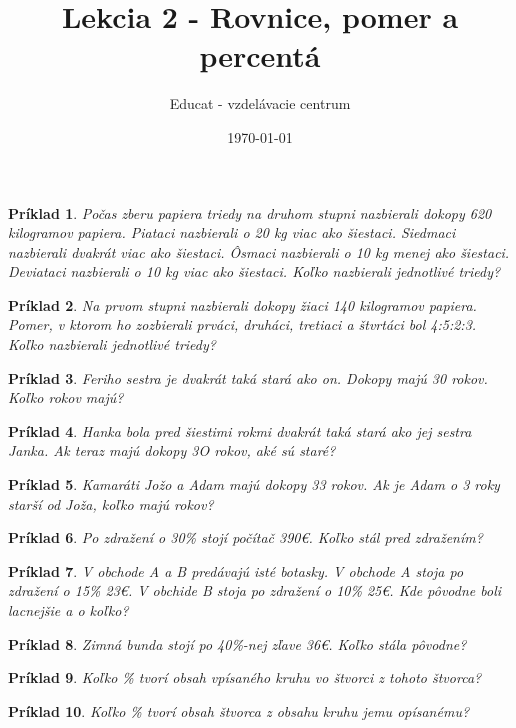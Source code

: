\documentclass{article}
\title{Lekcia 2 - Rovnice, pomer a percentá}
\date{\today}
\author{Educat - vzdelávacie centrum}
\newtheorem{example}{Príklad}
\begin{document}
	\maketitle
	
	\begin{example}
		Počas zberu papiera triedy na druhom stupni nazbierali dokopy 620 kilogramov papiera. Piataci nazbierali o 20 kg viac ako šiestaci. Siedmaci nazbierali dvakrát viac ako šiestaci. Ôsmaci nazbierali o 10 kg menej ako šiestaci. Deviataci nazbierali o 10 kg viac ako šiestaci.
		Koľko nazbierali jednotlivé triedy?
	\end{example}
	
	\begin{example}
		Na prvom stupni nazbierali dokopy žiaci 140 kilogramov papiera. Pomer, v ktorom ho zozbierali prváci, druháci, tretiaci a štvrtáci bol 4:5:2:3. Koľko nazbierali jednotlivé triedy?
	\end{example}
	
	\begin{example}
		Feriho sestra je dvakrát taká stará ako on. Dokopy majú 30 rokov. Koľko rokov majú?
	\end{example}
	
	\begin{example}
		Hanka bola pred šiestimi rokmi dvakrát taká stará ako jej sestra Janka. Ak teraz majú dokopy 3O rokov, aké sú staré?
	\end{example}
	
	\begin{example}
		Kamaráti Jožo a Adam majú dokopy 33 rokov. Ak je Adam o 3 roky starší od Joža, koľko majú rokov?
	\end{example}
	
	\begin{example}
		Po zdražení o 30\% stojí počítač 390€. Koľko stál pred zdražením?
	\end{example}
	
	\begin{example}
		V obchode A a B predávajú isté botasky. V obchode A stoja po zdražení o 15\% 23€. V obchide B stoja po zdražení o 10\% 25€. Kde pôvodne boli lacnejšie a o koľko?
	\end{example}
	
	\begin{example}
		Zimná bunda stojí po 40\%-nej zľave 36€. Koľko stála pôvodne?
	\end{example}
	
	\begin{example}
		Koľko \% tvorí obsah vpísaného kruhu vo štvorci z tohoto štvorca?
	\end{example}
	
	\begin{example}
		Koľko \% tvorí obsah štvorca z obsahu kruhu jemu opísanému?
	\end{example}
\end{document}
